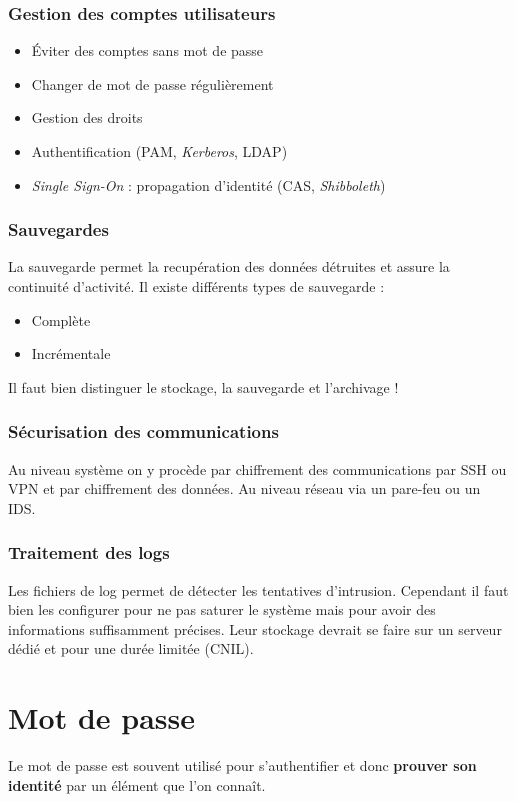 \documentclass[12pt, a4paper]{article}
\begin{document}
	\subsubsection{Gestion des comptes utilisateurs}
	\begin{itemize}
		\item Éviter des comptes sans mot de passe
		\item Changer de mot de passe régulièrement
		\item Gestion des droits
		\item Authentification (PAM, \textit{Kerberos}, LDAP)
		\item \textit{Single Sign-On} : propagation d'identité (CAS, \textit{Shibboleth})
	\end{itemize}
	\subsubsection{Sauvegardes}
	La sauvegarde permet la recupération des données détruites et assure la continuité d'activité. Il existe différents types de sauvegarde :
	\begin{itemize}
		\item Complète
		\item Incrémentale
	\end{itemize}
	Il faut bien distinguer le stockage, la sauvegarde et l'archivage !
	\subsubsection{Sécurisation des communications}
	Au niveau système on y procède par chiffrement des communications par SSH ou VPN et par chiffrement des données. Au niveau réseau via un pare-feu ou un IDS.
	\subsubsection{Traitement des logs}
	Les fichiers de log permet de détecter les tentatives d'intrusion. Cependant il faut bien les configurer pour ne pas saturer le système mais pour avoir des informations suffisamment précises. Leur stockage devrait se faire sur un serveur dédié et pour une durée limitée (CNIL).
	\section{Mot de passe}
	Le mot de passe est souvent utilisé pour s'authentifier et donc \textbf{prouver son identité} par un élément que l'on connaît.
\end{document}
